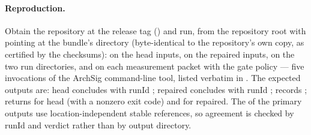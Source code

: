 \paragraph{Reproduction.}
Obtain the repository at the release tag
() and run, from the
repository root with  pointing at the bundle's
 directory (byte-identical to the repository's own
copy, as certified by the checksums):
 on the head inputs,  on the repaired
inputs,  on the two run directories, and  on
each measurement packet with the gate policy --- five invocations of
the ArchSig command-line tool, listed verbatim in
. The expected outputs are: head
 concludes  with
runId ; repaired  concludes
 with runId
;  records
;
 returns  for head (with a
nonzero exit code) and  for
repaired. The  of the primary outputs use
location-independent stable references, so agreement is checked by
runId and verdict rather than by output directory.
